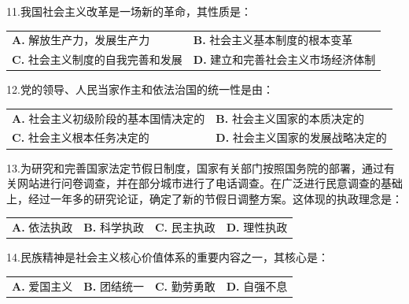 \documentclass[UTF8,11pt]{ctexart}
\begin{document}
11.我国社会主义改革是一场新的革命，其性质是：


\begin{center}\begin{tabular}{>{\raggedright\arraybackslash}p{\dimexpr(\linewidth-4\tabcolsep)/2\relax}>{\raggedright\arraybackslash}p{\dimexpr(\linewidth-4\tabcolsep)/2\relax}}
\textbf{A.} 解放生产力，发展生产力 & \textbf{B.} 社会主义基本制度的根本变革\\[.35em]
\textbf{C.} 社会主义制度的自我完善和发展 & \textbf{D.} 建立和完善社会主义市场经济体制\\[.35em]\end{tabular}\end{center}

12.党的领导、人民当家作主和依法治国的统一性是由：


\begin{center}\begin{tabular}{>{\raggedright\arraybackslash}p{\dimexpr(\linewidth-4\tabcolsep)/2\relax}>{\raggedright\arraybackslash}p{\dimexpr(\linewidth-4\tabcolsep)/2\relax}}
\textbf{A.} 社会主义初级阶段的基本国情决定的 & \textbf{B.} 社会主义国家的本质决定的\\[.35em]
\textbf{C.} 社会主义根本任务决定的 & \textbf{D.} 社会主义国家的发展战略决定的\\[.35em]\end{tabular}\end{center}

13.为研究和完善国家法定节假日制度，国家有关部门按照国务院的部署，通过有关网站进行问卷调查，并在部分城市进行了电话调查。在广泛进行民意调查的基础上，经过一年多的研究论证，确定了新的节假日调整方案。这体现的执政理念是：


\begin{center}\begin{tabular}{>{\raggedright\arraybackslash}p{\dimexpr(\linewidth-8\tabcolsep)/4\relax}>{\raggedright\arraybackslash}p{\dimexpr(\linewidth-8\tabcolsep)/4\relax}>{\raggedright\arraybackslash}p{\dimexpr(\linewidth-8\tabcolsep)/4\relax}>{\raggedright\arraybackslash}p{\dimexpr(\linewidth-8\tabcolsep)/4\relax}}
\textbf{A.} 依法执政 & \textbf{B.} 科学执政 & \textbf{C.} 民主执政 & \textbf{D.} 理性执政\\[.35em]\end{tabular}\end{center}

14.民族精神是社会主义核心价值体系的重要内容之一，其核心是：


\begin{center}\begin{tabular}{>{\raggedright\arraybackslash}p{\dimexpr(\linewidth-8\tabcolsep)/4\relax}>{\raggedright\arraybackslash}p{\dimexpr(\linewidth-8\tabcolsep)/4\relax}>{\raggedright\arraybackslash}p{\dimexpr(\linewidth-8\tabcolsep)/4\relax}>{\raggedright\arraybackslash}p{\dimexpr(\linewidth-8\tabcolsep)/4\relax}}
\textbf{A.} 爱国主义 & \textbf{B.} 团结统一 & \textbf{C.} 勤劳勇敢 & \textbf{D.} 自强不息\\[.35em]\end{tabular}\end{center}
\end{document}
